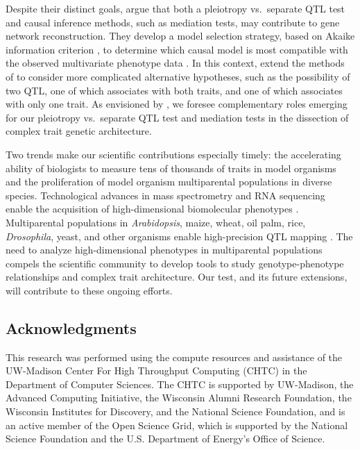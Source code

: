 \documentclass[12pt,twoside, lineno]{gsajnl}
\begin{document}
Despite their distinct goals, \citet{schadt2005integrative} argue that
both a pleiotropy vs.\ separate QTL test and causal inference methods,
such as mediation tests, may contribute to gene network
reconstruction. They develop a model selection strategy, based on
Akaike information criterion \citep{akaike1974new}, to determine which
causal model is most compatible with the observed multivariate
phenotype data \citep{schadt2005integrative}. In this context,
\citet{schadt2005integrative} extend the methods of
\citet{jiang1995multiple} to consider more complicated alternative
hypotheses, such as the possibility of two QTL, one of which
associates with both traits, and one of which associates with only one
trait. As envisioned by \citet{schadt2005integrative}, we foresee
complementary roles emerging for our pleiotropy vs.\ separate QTL test
and mediation tests in the dissection of complex trait genetic
architecture.

Two trends make our scientific contributions especially timely: the
accelerating ability of biologists to measure tens of thousands of
traits in model organisms and the proliferation of model organism
multiparental populations in diverse species. Technological advances
in mass spectrometry and RNA sequencing enable the acquisition of
high-dimensional biomolecular phenotypes
\citep{ozsolak2011rna,han2012multi}. Multiparental populations in
\textit{Arabidopsis}, maize, wheat, oil palm, rice,
\textit{Drosophila}, yeast, and other organisms enable high-precision
QTL mapping \citep{yu2008genetic, tisne2017identification,
  stanley2017genetic, raghavan2017approaches, mackay2012drosophila,
  kover2009multiparent, cubillos2013high}. The need to analyze
high-dimensional phenotypes in multiparental populations compels the
scientific community to develop tools to study genotype-phenotype
relationships and complex trait architecture. Our test, and its future
extensions, will contribute to these ongoing efforts.




\subsection*{Acknowledgments}

This research was performed using the compute resources and assistance
of the UW-Madison Center For High Throughput Computing (CHTC) in the
Department of Computer Sciences. The CHTC is supported by UW-Madison,
the Advanced Computing Initiative, the Wisconsin Alumni Research
Foundation, the Wisconsin Institutes for Discovery, and the National
Science Foundation, and is an active member of the Open Science Grid,
which is supported by the National Science Foundation and the U.S.
Department of Energy's Office of Science.
\end{document}
